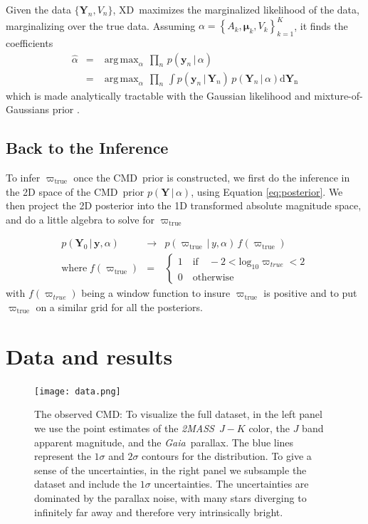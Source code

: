 \documentclass[modern]{aastex61}
\newcommand{\acronym}[1]{{\small{#1}}}
\newcommand{\project}[1]{\textsl{#1}}
\newcommand{\tmass}{\project{\acronym{2MASS}}}
\newcommand{\gaia}{\project{Gaia}}
\newcommand{\xd}{\acronym{XD}}
\newcommand{\cmd}{\acronym{CMD}}
\DeclareMathOperator*{\argmax}{arg\,max}
\newcommand{\given}{\,|\,}
\newcommand{\true}{\mathrm{true}}
\begin{document}
Given the data $\{ \mathbf{Y}_n, V_n\}$, \xd\ maximizes the marginalized likelihood of the data, marginalizing over the true data. Assuming $\alpha = \left\{A_k, \mathbf{\mu}_k, V_k\right\}_{k=1}^K$, it finds the coefficients
\begin{eqnarray}
\hat{\alpha} &=& \argmax_{\alpha} \, \prod_n \, p(\mathbf{y}_n \given \alpha) \nonumber\\
             &=& \argmax_{\alpha} \, \prod_n \, \int p(\mathbf{y}_n \given \mathbf{Y}_n) \, p(\mathbf{Y}_n \given \alpha)\mathrm{d\mathbf{Y}_n}
\label{eq:xdmml}
\end{eqnarray}
which is made analytically tractable with the Gaussian likelihood and mixture-of-Gaussians prior \citep{bovy11}.

\subsection{Back to the Inference}

To infer $\varpi_{\true}$ once the \cmd\ prior is constructed, we first do the inference in the 2D space of the \cmd\ prior $p(\mathbf{Y} \given \alpha)$, using Equation \ref{eq:posterior}. We then project the 2D posterior into the 1D transformed absolute magnitude space, and do a little algebra to solve for $\varpi_{\true}$

\begin{eqnarray}
p(\mathbf{Y}_0 \given \mathbf{y}, \alpha) &\rightarrow& p(\varpi_{\true} \given y, \alpha) \, f(\varpi_{\true}) \\
\mathrm{where} \; f(\varpi_{\true}) &=& \begin{cases}
              1 \quad \mathrm{if} \quad -2 < \mathrm{log}_{10} \varpi_{true} < 2\\
              0 \quad \mathrm{otherwise}
              \end{cases}
\label{eq:parallaxPost}
\end{eqnarray}
with $f(\varpi_{true})$ being a window function to insure $\varpi_{\true}$ is positive and to put $\varpi_{\true}$ on a similar grid for all the posteriors.

\section{Data and results}
\begin{figure}
\centering
  \texttt{[image: data.png]}
\caption{The observed \cmd: To visualize the full dataset, in the left panel we use the point estimates of the \tmass\ $J-K$ color, the $J$ band apparent magnitude, and the \gaia\ parallax. The blue lines represent the $1\sigma$ and $2\sigma$ contours for the distribution. To give a sense of the uncertainties, in the right panel we subsample the dataset and include the $1\sigma$ uncertainties. The uncertainties are dominated by the parallax noise, with many stars diverging to infinitely far away and therefore very intrinsically bright.}
\label{fig:data}
\end{figure}
\end{document}
